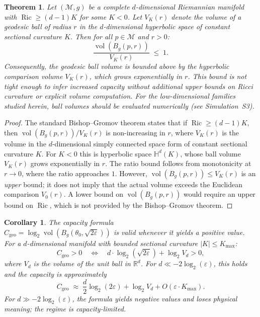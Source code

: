 \documentclass[a4paper,fleqn]{cas-dc}
\newtheorem{theorem}{Theorem}
\newtheorem{corollary}{Corollary}
\begin{document}
\begin{theorem}%
\label{thm:bishop_gromov_hyperbolic}
Let $(\mathcal{M},g)$ be a complete $d$-dimensional Riemannian manifold with 
$\operatorname{Ric} \geq (d-1)K$ for some $K<0$.  
Let $V_{K}(r)$ denote the volume of a geodesic ball of radius $r$ in the 
$d$-dimensional hyperbolic space of constant sectional curvature $K$.  
Then for all $p\in\mathcal{M}$ and $r>0$:
\[
\frac{\operatorname{vol}(B_{g}(p,r))}{V_{K}(r)} \;\leq\; 1.
\]
Consequently, the geodesic ball volume is bounded above by the hyperbolic 
comparison volume $V_{K}(r)$, which grows exponentially in $r$.  
This bound is not tight enough to infer increased capacity without additional 
upper bounds on Ricci curvature or explicit volume computation.  
For the low-dimensional families studied herein, ball volumes should be 
evaluated numerically (see Simulation~S3).
\end{theorem}

\begin{proof}
The standard Bishop--Gromov theorem \cite[Thm.~III.4.2]{chavel2006riemannian} 
states that if $\operatorname{Ric} \geq (d-1)K$, then 
$\operatorname{vol}(B_{g}(p,r))/V_{K}(r)$ is non-increasing in $r$, where 
$V_{K}(r)$ is the volume in the $d$-dimensional simply connected space form of 
constant sectional curvature $K$.  
For $K<0$ this is hyperbolic space $\mathbb{H}^{d}(K)$, whose ball volume 
$V_{K}(r)$ grows exponentially in $r$.  
The ratio bound follows from monotonicity at $r\to 0$, where the ratio 
approaches $1$.  
However, $\operatorname{vol}(B_{g}(p,r)) \leq V_{K}(r)$ is an \emph{upper} 
bound; it does not imply that the actual volume exceeds the Euclidean 
comparison $V_{0}(r)$.  
A lower bound on $\operatorname{vol}(B_{g}(p,r))$ would require an upper bound 
on $\operatorname{Ric}$, which is not provided by the Bishop--Gromov theorem.
\end{proof}

\begin{corollary}%
\label{cor:capacity_regime}
The capacity formula\\ $C_{\mathrm{geo}}=\log_{2}\operatorname{vol}(B_{g}
(\theta_{0},\sqrt{2\varepsilon}))$ is valid whenever it yields a positive 
value.  
For a $d$-dimensional manifold with bounded sectional curvature 
$|K|\leq K_{\max}$:
\[
C_{\mathrm{geo}}>0
\quad\Longleftrightarrow\quad
d\cdot\log_{2}(\sqrt{2\varepsilon})+\log_{2}V_{d}>0,
\]
where $V_{d}$ is the volume of the unit ball in $\mathbb{R}^{d}$.  
For $d\ll -2\log_{2}(\varepsilon)$, this holds and the capacity is 
approximately
\[
C_{\mathrm{geo}}
\;\approx\;
\frac{d}{2}\log_{2}(2\varepsilon)+\log_{2}V_{d}
+O(\varepsilon\cdot K_{\max}).
\]
For $d\gg -2\log_{2}(\varepsilon)$, the formula yields negative values and 
loses physical meaning; the regime is capacity-limited.
\end{corollary}
\end{document}
